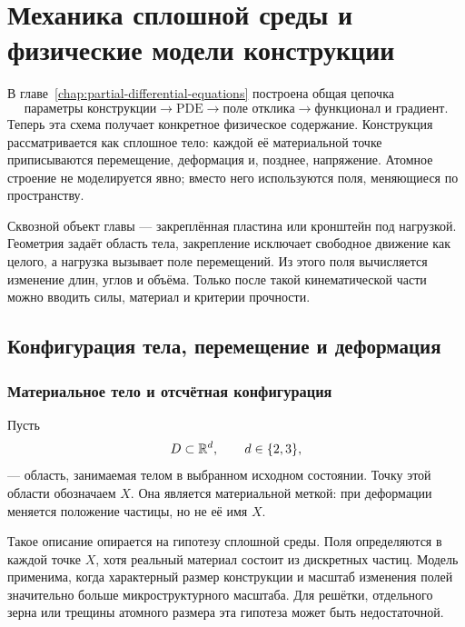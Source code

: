 
\chapter{Механика сплошной среды и физические модели конструкции}
\label{chap:continuum-mechanics}

В главе~\ref{chap:partial-differential-equations} построена общая цепочка
\[
\text{параметры конструкции}
\longrightarrow
\text{PDE}
\longrightarrow
\text{поле отклика}
\longrightarrow
\text{функционал и градиент}.
\]
Теперь эта схема получает конкретное физическое содержание. Конструкция рассматривается как сплошное тело: каждой её материальной точке приписываются перемещение, деформация и, позднее, напряжение. Атомное строение не моделируется явно; вместо него используются поля, меняющиеся по пространству.

Сквозной объект главы --- закреплённая пластина или кронштейн под нагрузкой. Геометрия задаёт область тела, закрепление исключает свободное движение как целого, а нагрузка вызывает поле перемещений. Из этого поля вычисляется изменение длин, углов и объёма. Только после такой кинематической части можно вводить силы, материал и критерии прочности.

\section{Конфигурация тела, перемещение и деформация}
\label{sec:continuum-kinematics}

\subsection{Материальное тело и отсчётная конфигурация}

Пусть
\[
D\subset\mathbb{R}^d,
\qquad d\in\{2,3\},
\]
--- область, занимаемая телом в выбранном исходном состоянии. Точку этой области обозначаем $X$. Она является материальной меткой: при деформации меняется положение частицы, но не её имя $X$.

Такое описание опирается на гипотезу сплошной среды. Поля определяются в каждой точке $X$, хотя реальный материал состоит из дискретных частиц. Модель применима, когда характерный размер конструкции и масштаб изменения полей значительно больше микроструктурного масштаба. Для решётки, отдельного зерна или трещины атомного размера эта гипотеза может быть недостаточной.


